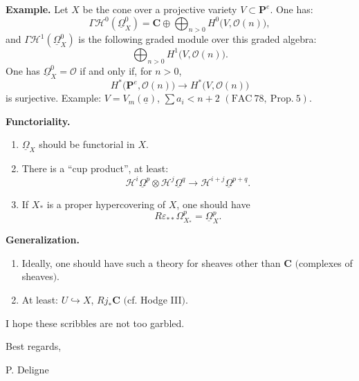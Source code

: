 \documentclass[11pt]{article}
\newcommand{\OO}{\mathcal O}
\newcommand{\CC}{\mathbf C}
\newcommand{\PP}{\mathbf P}
\newcommand{\HH}{\mathcal H}
\newcommand{\uOmega}{\underline{\Omega}}
\newcommand{\eps}{\varepsilon}
\begin{document}
\textbf{Example.} Let \(X\) be the cone over a projective variety \(V\subset\PP^e\). One has:
\[
\Gamma\HH^0(\uOmega^0_X)=\CC\oplus\bigoplus_{n>0}H^0\bigl(V,\OO(n)\bigr),
\]
and \(\Gamma\HH^1(\uOmega^0_X)\) is the following graded module over this graded algebra:
\[
\bigoplus_{n>0}H^1\bigl(V,\OO(n)\bigr).
\]
One has \(\uOmega^0_X=\OO\) if and only if, for \(n>0\),
\[
H^\ast\bigl(\PP^e,\OO(n)\bigr)\longrightarrow H^\ast\bigl(V,\OO(n)\bigr)
\]
is surjective. Example: \(V=V_m(\underline a)\), \(\sum a_i<n+2\) \((\mathrm{FAC}\ 78,\ \mathrm{Prop.}\ 5)\).

\textbf{Functoriality.}
\begin{enumerate}[label=\alph*)]
\item \(\uOmega_X\) should be functorial in \(X\).
\item There is a ``cup product'', at least:
\[
\HH^i\uOmega^p\otimes\HH^j\uOmega^q\longrightarrow
\HH^{i+j}\uOmega^{p+q}.
\]
\item If \(X_\ast\) is a proper hypercovering of \(X\), one should have
\[
R\eps_{\ast\ast}\Omega^p_{X_\ast}=\uOmega^p_X.
\]
\end{enumerate}

\textbf{Generalization.}
\begin{enumerate}[label=\alph*)]
\item Ideally, one should have such a theory for sheaves other than \(\CC\) \(\bigl(\)complexes of sheaves\(\bigr)\).
\item At least: \(U\hookrightarrow X\), \(Rj_\ast\CC\) \((\)cf. Hodge III\()\).
\end{enumerate}

I hope these scribbles are not too garbled.

Best regards,

\hspace{2em}P. Deligne
\end{document}
